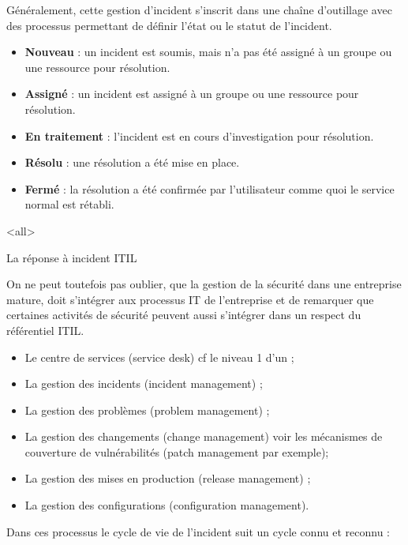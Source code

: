 Généralement, cette gestion d'incident s'inscrit dans une chaîne d'outillage avec des processus permettant de définir l'état ou le statut de l'incident.

\begin{itemize}
  \item \textbf{Nouveau} : un incident est soumis, mais n'a pas été assigné à un groupe ou une ressource pour résolution.
  \item \textbf{Assigné} : un incident est assigné à un groupe ou une ressource pour résolution.
  \item \textbf{En traitement }: l'incident est en cours d'investigation pour résolution.
  \item \textbf{Résolu} : une résolution a été mise en place.
  \item \textbf{Fermé} : la résolution a été confirmée par l'utilisateur comme quoi le service normal est rétabli.
\end{itemize}


\mode<all>{\texframe
{La réponse à incident}
{ITIL}
{%
On ne peut toutefois pas oublier, que la gestion de la sécurité dans une entreprise mature, doit s'intégrer aux processus IT de l'entreprise et de remarquer que certaines activités de sécurité peuvent aussi s'intégrer dans un respect du référentiel ITIL.

\begin{itemize}
  \item Le centre de services (service desk) cf le niveau 1 d'un ;
  \item La gestion des incidents (incident management) ;
  \item La gestion des problèmes (problem management) ;
  \item La gestion des changements (change management) voir  les mécanismes de couverture de vulnérabilités (patch management par exemple);
  \item La gestion des mises en production (release management) ;
  \item La gestion des configurations (configuration management).
\end{itemize}
}} %

Dans ces processus le cycle de vie de l'incident suit un cycle connu et reconnu : 


